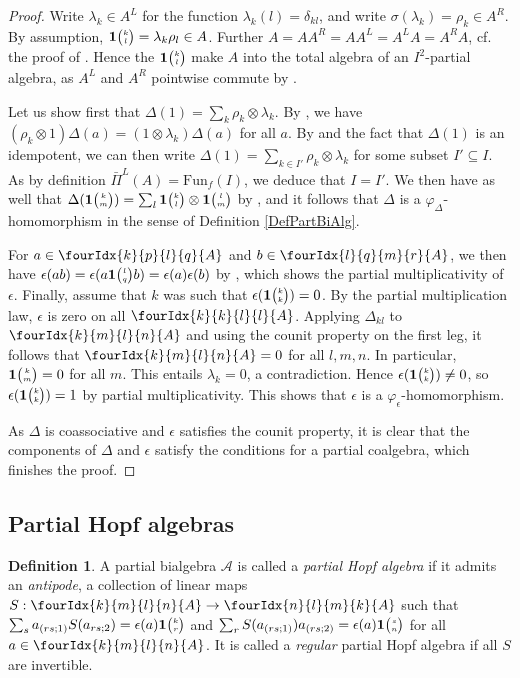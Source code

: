 \documentclass[10pt]{article}
\newcommand{\Fun}{\mathrm{Fun}}
\newcommand{\Grt}[3]{#1{\tiny {\begin{pmatrix} #2\\#3\end{pmatrix}}}}
\newcommand{\UnitC}[2]{\Grt{\mathbf{1}}{#1}{#2}}
\newcommand{\Gr}[5]{\fourIdx{#2}{#4}{#3}{#5}{#1}}%
\theoremstyle{definition}
\newtheorem{Def}[Theorem]{Definition}
\numberwithin{equation}{section}
\begin{document}
\begin{proof} Write $\lambda_k \in A^L$ for the function $\lambda_k(l) = \delta_{kl}$, and write $\sigma(\lambda_k) = \rho_k\in A^R$. By assumption, $\UnitC{k}{l} = \lambda_k\rho_l\in A$. Further $A= AA^R = AA^L = A^LA=A^RA$, cf.~ the proof of \cite[Theorem 3.13]{Boh1}. Hence the $\UnitC{k}{l}$ make $A$ into the total algebra of an $I^2$-partial algebra, as $A^L$ and $A^R$ pointwise commute by \cite[Lemma 3.5]{Boh1}. 

Let us show first that $\Delta(1) = \sum_k \rho_k\otimes \lambda_k$. By \cite[Lemma 3.9]{Boh1}, we have $(\rho_k\otimes 1)\Delta(a) = (1\otimes \lambda_k)\Delta(a)$ for all $a$. By \cite[Lemma 4.10]{Boh1} and the fact that $\Delta(1)$ is an idempotent, we can then write $\Delta(1)=\sum_{k\in I'} \rho_k\otimes \lambda_k$ for some subset $I'\subseteq I$. As by definition $\bar{\Pi}^L(A) = \Fun_{f}(I)$, we deduce that $I=I'$. We then have as well that $\Delta(\UnitC{k}{m}) = \sum_l \UnitC{k}{l}\otimes \UnitC{l}{m}$ by \cite[Lemma 3.3]{Boh1}, and it follows that $\Delta$ is a $\varphi_{\Delta}$-homomorphism in the sense of Definition \ref{DefPartBiAlg}.

For $a\in \Gr{A}{k}{l}{p}{q}$ and $b\in \Gr{A}{l}{m}{q}{r}$, we then have $\epsilon(ab) = \epsilon(a\UnitC{l}{q}b) = \epsilon(a)\epsilon(b)$ by \cite[Proposition 2.6.(4)]{Boh1}, which shows the partial multiplicativity of $\epsilon$. Finally, assume that $k$ was such that $\epsilon(\UnitC{k}{k})=0$. By the partial multiplication law, $\epsilon$ is zero on all $\Gr{A}{k}{l}{k}{l}$. Applying $\Delta_{kl}$ to $\Gr{A}{k}{l}{m}{n}$ and using the counit property on the first leg, it follows that $\Gr{A}{k}{l}{m}{n}=0$ for all $l,m,n$. In particular, $\UnitC{k}{m}=0$ for all $m$. This entails $\lambda_k=0$, a contradiction. Hence $\epsilon(\UnitC{k}{k})\neq 0$, so $\epsilon(\UnitC{k}{k})=1$ by partial multiplicativity. This shows that $\epsilon$ is a $\varphi_{\epsilon}$-homomorphism.

As $\Delta$ is coassociative and $\epsilon$ satisfies the counit property, it is clear that the components of $\Delta$ and $\epsilon$ satisfy the conditions for a partial coalgebra, which finishes the proof.
\end{proof} 

\subsection{Partial Hopf algebras}

\begin{Def}\label{DefPartBiAlgAnt}A partial bialgebra $\mathscr{A}$ is called a \emph{partial Hopf algebra} if it admits an \emph{antipode}, a collection of linear
maps $S:\Gr{A}{k}{l}{m}{n}\rightarrow \Gr{A}{n}{m}{l}{k}$ such that $\sum_s a_{(rs;1)}S(a_{rs;2})= \epsilon(a)\UnitC{k}{r}$ and $\sum_r S(a_{(rs;1)})a_{(rs;2)}= \epsilon(a)\UnitC{s}{n}$ for all $a \in \Gr{A}{k}{l}{m}{n}$. It is called a \emph{regular} partial Hopf algebra if all $S$ are invertible.
\end{Def} 
\end{document}
